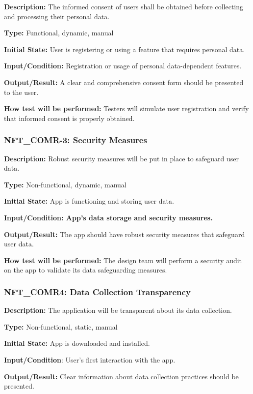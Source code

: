 \documentclass[12pt, titlepage]{article}
\begin{document}
\textbf{Description: }The informed consent of users shall be obtained before collecting and processing their personal data.

\textbf{Type:} Functional, dynamic, manual

\textbf{Initial State:} User is registering or using a feature that requires personal data.

\textbf{Input/Condition:} Registration or usage of personal data-dependent features.

\textbf{Output/Result:} A clear and comprehensive consent form should be presented to the user.

\textbf{How test will be performed:} Testers will simulate user registration and verify that informed consent is properly obtained.


\subsubsection*{\textbf{NFT\_COMR-3: Security Measures}
}

\textbf{Description: }Robust security measures will be put in place to safeguard user data.

\textbf{Type:} Non-functional, dynamic, manual

\textbf{Initial State:} App is functioning and storing user data.

\textbf{Input/Condition: App's data storage and security measures.}

\textbf{Output/Result: }The app should have robust security measures that safeguard user data.

\textbf{How test will be performed:} The design team will perform a security audit on the app to validate its data safeguarding measures.


\subsubsection*{\textbf{NFT\_COMR4: Data Collection Transparency}
}

\textbf{Description: }The application will be transparent about its data collection.

\textbf{Type:} Non-functional, static, manual

\textbf{Initial State: }App is downloaded and installed.

\textbf{Input/Condition}: User's first interaction with the app.

\textbf{Output/Result:} Clear information about data collection practices should be presented.
\end{document}
